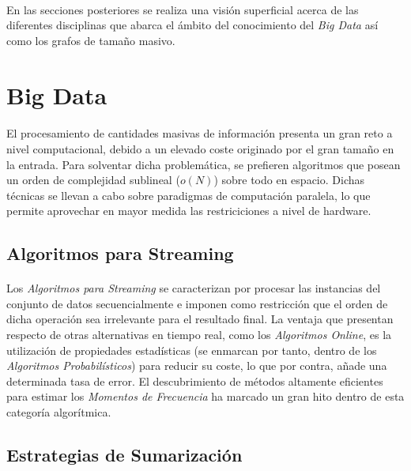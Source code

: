 \documentclass{subfiles}
\begin{document}
      \paragraph{}
      En las secciones posteriores se realiza una visión superficial acerca de las diferentes disciplinas que abarca el ámbito del conocimiento del \emph{Big Data} así como los grafos de tamaño masivo.

    \section{Big Data}
    \label{sec:introduction_big_data}

      \paragraph{}
      El procesamiento de cantidades masivas de información presenta un gran reto a nivel computacional, debido a un elevado coste originado por el gran tamaño en la entrada. Para solventar dicha problemática, se prefieren algoritmos que posean un orden de complejidad sublineal ($o(N)$) sobre todo en espacio. Dichas técnicas se llevan a cabo sobre paradigmas de computación paralela, lo que permite aprovechar en mayor medida las restriciciones a nivel de hardware.

      \subsection{Algoritmos para Streaming}

        \paragraph{}
        Los \emph{Algoritmos para Streaming} se caracterizan por procesar las instancias del conjunto de datos secuencialmente e imponen como restricción que el orden de dicha operación sea irrelevante para el resultado final. La ventaja que presentan respecto de otras alternativas en tiempo real, como los \emph{Algoritmos Online}, es la utilización de propiedades estadísticas (se enmarcan por tanto, dentro de los \emph{Algoritmos Probabilísticos}) para reducir su coste, lo que por contra, añade una determinada tasa de error. El descubrimiento de métodos altamente eficientes para estimar los \emph{Momentos de Frecuencia} ha marcado un gran hito dentro de esta categoría algorítmica.

      \subsection{Estrategias de Sumarización}
\end{document}
